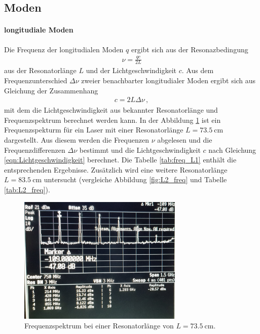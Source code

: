 \subsection{Moden}
\label{subsec:tem}
\paragraph{longitudiale Moden}
Die Frequenz der longitudialen Moden $q$
ergibt sich aus der Resonazbedingung
\begin{align}
  \nu=\frac{qc}{2L} \label{eqn:longi_mode}
\end{align}
aus der Resonatorlänge $L$ und der Lichtgeschwindigkeit $c$.
Aus dem Frequenzunterschied $\Delta \nu$ zweier benachbarter longitudialer Moden
ergibt sich aus Gleichung \label{eqn:longi_mode} der Zusammenhang
\begin{align}
  c = 2L\Delta \nu \, ,  \label{eqn:Lichtgeschwindigkeit}
\end{align}
mit dem die Lichtgeschwindigkeit aus bekannter Resonatorlänge und Frequenzspektrum
berechnet werden kann.
In der Abbildung \ref{fig:L1_freq} ist ein Frequenzspekturm für ein Laser mit einer Resonatorlänge $L=\SI{73.5}{\centi\meter}$
dargestellt. Aus diesem werden die Frequenzen $\nu$ abgelesen
 und die Frequenzdifferenzen $\Delta \nu $ bestimmt und die Lichtgeschwindigkeit $c$ nach Gleichung \ref{eqn:Lichtgeschwindigkeit}
berechnet.
Die Tabelle \ref{tab:freq_L1} enthält die entsprechenden Ergebnisse.
Zusätzlich wird eine weitere Resonatorlänge $L = \SI{83.5}{\centi\meter}$  untersucht
(vergleiche Abbildung \ref{fig:L2_freq} und Tabelle \ref{tab:L2_freq}).

\begin{figure}
\centering
  \includegraphics[width=0.7\textwidth]{pictures/freq_1.jpg}
  \caption{Frequenzspektrum bei einer Resonatorlänge von $L=\SI{73.5}{\centi\meter}$.}
  \label{fig:L1_freq}
\end{figure}

